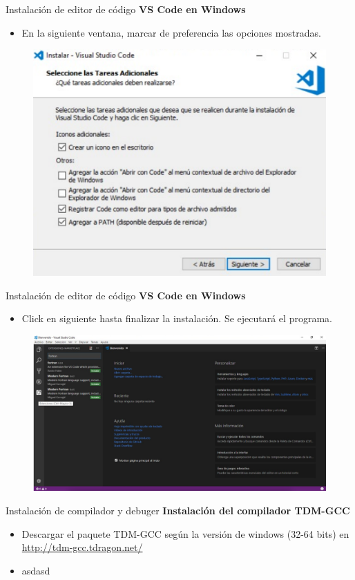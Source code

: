 \begin{frame}[fragile]{Instalación de editor de código}
  \textbf{VS Code en Windows}
  \begin{itemize}[<+(1)->]
    \item En la siguiente ventana, marcar de preferencia las opciones mostradas.
  \end{itemize} 
  \begin{figure}
    \includegraphics[width=1\textwidth]{./resources/3.png}
  \end{figure}
\end{frame}

\begin{frame}[fragile]{Instalación de editor de código}
  \textbf{VS Code en Windows}
  \begin{itemize}[<+(1)->]
    \item Click en siguiente hasta finalizar la instalación. Se ejecutará el programa.
  \end{itemize}
  \begin{figure}
    \includegraphics[width=1\textwidth]{./resources/4.png}
  \end{figure}
\end{frame}

\begin{frame}[fragile]{Instalación de compilador y debuger}
 \textbf{Instalación del compilador TDM-GCC}
 \begin{itemize}[<+(1)->]
  \item Descargar el paquete TDM-GCC según la versión de windows (32-64 bits) en \url{http://tdm-gcc.tdragon.net/}
  \item asdasd
 \end{itemize}
\end{frame}

